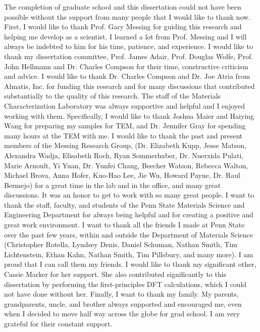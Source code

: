 The completion of graduate school and this dissertation could not have been possible without the support from many people that I would like to thank now.  
First, I would like to thank Prof. Gary Messing for guiding this research and helping me develop as a scientist. I learned a lot from Prof. Messing and I will always be indebted to him for his time, patience, and experience. 
I would like to thank my dissertation committee, Prof. James Adair, Prof. Douglas Wolfe, Prof. John Hellmann and Dr. Charles Compson for their time, constructive criticism and advice. 
I would like to thank Dr. Charles Compson and Dr. Joe Atria from Almatis, Inc. for funding this research and for many discussions that contributed substantially to the quality of this research. 
The staff of the Materials Characterization Laboratory was always supportive and helpful and I enjoyed working with them. Specifically, I would like to thank Joshua Maier and Haiying Wang for preparing my samples for TEM, and Dr. Jennifer Gray for spending many hours at the TEM with me.
I would like to thank the past and present members of the Messing Research Group, (Dr. Elizabeth Kupp, Jesse Matson, Alexandra Wadja, Elisabeth Roch, Ryan Sommerhuber, Dr. Nuerxida Pulati, Marie Arnoult, Yi Yuan, Dr. Yunfei Chang, Beecher Watson, Rebecca Walton, Michael Brova, Anna Hofer, Kuo-Hao Lee, Jie Wu, Howard Payne, Dr. Raul Bermejo) for a great time in the lab and in the office, and many great discussions. It was an honor to get to work with so many great people.
I want to thank the staff, faculty, and students of the Penn State Materials Science and Engineering Department for always being helpful and for creating a positive and great work environment.
I want to thank all the friends I made at Penn State over the past few years, within and outside the Department of Materials Science (Christopher Rotella, Lyndsey Denis, Daniel Schuman, Nathan Smith, Tim Lichtenstein, Ethan Kahn, Nathan Smith, Tim Pillsbury, and many more). I am proud that I can call them my friends.
I would like to thank my significant other, Cassie Marker for her support. She also contributed significantly to this dissertation by performing the first-principles DFT calculations, which I could not have done without her.
Finally, I want to thank my family. My parents, grandparents, uncle, and brother always supported and encouraged me, even when I decided to move half way across the globe for grad school. I am very grateful for their constant support.
